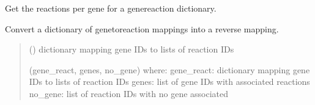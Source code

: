 \documentclass[letterpaper,12pt,english]{sphinxmanual}
\begin{document}

\begin{fulllineitems}
\label{\detokenize{api/core:cbmpy.CBTools.getReactionsPerGene}}
\pysigstartsignatures
\pysiglinewithargsret
{}
{}
{}
\pysigstopsignatures
\sphinxAtStartPar
Get the reactions per gene for a gene\sphinxhyphen{}reaction dictionary.

\sphinxAtStartPar
Convert a dictionary of gene\sphinxhyphen{}to\sphinxhyphen{}reaction mappings into a reverse mapping.
\begin{quote}\begin{description}
\sphinxAtStartPar
{} () \textendash{} dictionary mapping gene IDs to lists of reaction IDs

\sphinxAtStartPar
{} \textendash{} (gene\_react, genes, no\_gene) where:
\sphinxhyphen{} gene\_react: dictionary mapping gene IDs to lists of reaction IDs
\sphinxhyphen{} genes: list of gene IDs with associated reactions
\sphinxhyphen{} no\_gene: list of reaction IDs with no gene associated

\end{description}\end{quote}

\end{fulllineitems}

\end{document}
